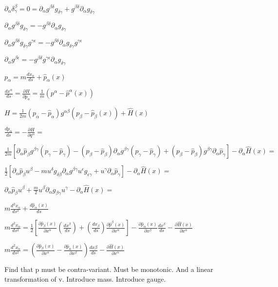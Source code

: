 \documentclass[aps,pra,10pt,twocolumn,floatfix,nofootinbib]{revtex4-1}
\theoremstyle{definition}
\begin{document}
$\partial_\alpha \delta^\beta_\gamma = 0 = \partial_\alpha g^{\beta\delta} g_{\delta\gamma} + g^{\beta\delta} \partial_\alpha g_{\delta\gamma}$

$\partial_\alpha g^{\beta\delta} g_{\delta\gamma} = - g^{\beta\delta} \partial_\alpha g_{\delta\gamma}$

$\partial_\alpha g^{\beta\delta} g_{\delta\gamma} g^{\gamma\epsilon} = - g^{\beta\delta} \partial_\alpha g_{\delta\gamma} g^{\gamma\epsilon}$

$\partial_\alpha g^{\beta\epsilon} = - g^{\beta\delta} g^{\gamma\epsilon} \partial_\alpha g_{\delta\gamma} $

$p_\alpha=m\frac{dx_\alpha}{ds}+\hat{p}_\alpha(x)$


$\frac{dx^\alpha}{ds}=\frac{\partial H}{\partial p_\alpha}=\frac{1}{m}(p^\alpha-\hat{p}^\alpha(x))$

$H=\frac{1}{2m}(p_\alpha-\hat{p}_\alpha)g^{\alpha\beta}(p_\beta-\hat{p}_\beta(x))+\hat{H}(x)$

$\frac{dp_\alpha}{ds}=-\frac{\partial H}{\partial q^\alpha}=$

$\frac{1}{2m}[\partial_\alpha \hat{p}_\beta g^{\beta \gamma} (p_\gamma -\hat{p}_\gamma)
 - (p_\beta -\hat{p}_\beta) \partial_\alpha g^{\beta \gamma} (p_\gamma -\hat{p}_\gamma)
 + (p_\beta -\hat{p}_\beta) g^{\beta \gamma} \partial_\alpha \hat{p}_\gamma ]- \partial_\alpha \hat{H}(x)=$

$\frac{1}{2}[\partial_\alpha \hat{p}_\beta u^\beta
- m u^\delta g_{\delta\beta} \partial_\alpha g^{\beta \gamma} u^\epsilon g_{\epsilon\gamma}
+ u^\gamma \partial_\alpha \hat{p}_\gamma ]- \partial_\alpha \hat{H}(x)=$

$\partial_\alpha \hat{p}_\beta u^\beta + \frac{m}{2}u^\beta \partial_\alpha g_{\beta \gamma} u^\gamma
- \partial_\alpha \hat{H}(x)=$

$m\frac{d^2x_\alpha}{ds^2}+\frac{d\hat{p}_\alpha(x)}{ds}$

$m\frac{d^2x_\alpha}{ds^2}=\frac{1}{2}[\frac{\partial\hat{p}_\beta(x)}{\partial x^\alpha} (\frac{dx^\beta}{ds}) + (\frac{dx_\beta}{ds})\frac{\partial\hat{p}^\beta(x)}{\partial x^\alpha} ]-\frac{\partial\hat{p}_\alpha(x)}{\partial x^\beta}\frac{dx^\beta}{ds}
-\frac{\partial \hat{H}(x)}{\partial x^\alpha}$

$m\frac{d^2x_\alpha}{ds^2}=(\frac{\partial\hat{p}_\beta(x)}{\partial x^\alpha} - \frac{\partial\hat{p}_\alpha(x)}{\partial x^\beta} ) \frac{dx\beta}{ds}
-\frac{\partial \hat{H}(x)}{\partial x^\alpha}$

Find that p must be contra-variant. Must be monotonic. And a linear transformation of v. Introduce mass. Introduce gauge.
\end{document}

